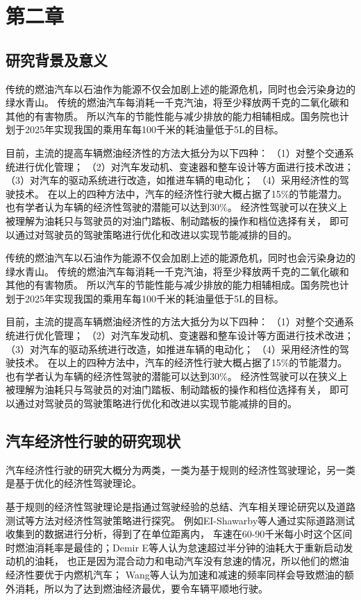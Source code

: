 \chapter{第二章}
\section{研究背景及意义}
传统的燃油汽车以石油作为能源不仅会加剧上述的能源危机，同时也会污染身边的绿水青山。
传统的燃油汽车每消耗一千克汽油，将至少释放两千克的二氧化碳和其他的有害物质。
所以汽车的节能性能与减少排放的能力相辅相成。国务院也计划于2025年实现我国的乘用车每100千米的耗油量低于5L的目标。

目前，主流的提高车辆燃油经济性的方法大抵分为以下四种：
    （1）对整个交通系统进行优化管理；
    （2）对汽车发动机、变速器和整车设计等方面进行技术改进；
    （3）对汽车的驱动系统进行改造，如推进车辆的电动化；
    （4）采用经济性的驾驶技术。
在以上的四种方法中，汽车的经济性行驶大概占据了15\%的节能潜力。也有学者认为车辆的经济性驾驶的潜能可以达到30\%。
经济性驾驶可以在狭义上被理解为油耗只与驾驶员的对油门踏板、制动踏板的操作和档位选择有关，
即可以通过对驾驶员的驾驶策略进行优化和改进以实现节能减排的目的。

传统的燃油汽车以石油作为能源不仅会加剧上述的能源危机，同时也会污染身边的绿水青山。
传统的燃油汽车每消耗一千克汽油，将至少释放两千克的二氧化碳和其他的有害物质。
所以汽车的节能性能与减少排放的能力相辅相成。国务院也计划于2025年实现我国的乘用车每100千米的耗油量低于5L的目标。

目前，主流的提高车辆燃油经济性的方法大抵分为以下四种：
    （1）对整个交通系统进行优化管理；
    （2）对汽车发动机、变速器和整车设计等方面进行技术改进；
    （3）对汽车的驱动系统进行改造，如推进车辆的电动化；
    （4）采用经济性的驾驶技术。
在以上的四种方法中，汽车的经济性行驶大概占据了15\%的节能潜力。也有学者认为车辆的经济性驾驶的潜能可以达到30\%。
经济性驾驶可以在狭义上被理解为油耗只与驾驶员的对油门踏板、制动踏板的操作和档位选择有关，
即可以通过对驾驶员的驾驶策略进行优化和改进以实现节能减排的目的。

\section{汽车经济性行驶的研究现状}
汽车经济性行驶的研究大概分为两类，一类为基于规则的经济性驾驶理论，另一类是基于优化的经济性驾驶理论。

基于规则的经济性驾驶理论是指通过驾驶经验的总结、汽车相关理论研究以及道路测试等方法对经济性驾驶策略进行探究。
例如EI-Shawarby等人通过实际道路测试收集到的数据进行分析，得到了在单位距离内，
车速在60-90千米每小时这个区间时燃油消耗率是最佳的；Demir E等人认为怠速超过半分钟的油耗大于重新启动发动机的油耗，
也正是因为混合动力和电动汽车没有怠速的情况，所以他们的燃油经济性要优于内燃机汽车；
Wang等人认为加速和减速的频率同样会导致燃油的额外消耗，所以为了达到燃油经济最优，要令车辆平顺地行驶。

